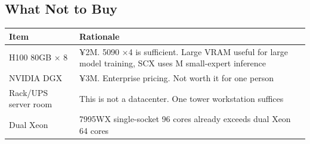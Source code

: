 \documentclass[
  12pt,
]{article}
\begin{document}
\subsection{What Not to Buy}\label{what-not-to-buy}

\begin{longtable}[]{@{}
  >{\raggedright\arraybackslash}p{}
  >{\raggedright\arraybackslash}p{}@{}}
\toprule\noalign{}
\begin{minipage}[b]{\linewidth}\raggedright
Item
\end{minipage} & \begin{minipage}[b]{\linewidth}\raggedright
Rationale
\end{minipage} \\
\midrule\noalign{}
\endhead
\bottomrule\noalign{}
\endlastfoot
H100 80GB × 8 & ¥2M. 5090 ×4 is sufficient. Large VRAM useful for large model training, SCX uses M small-expert inference \\
NVIDIA DGX & ¥3M. Enterprise pricing. Not worth it for one person \\
Rack/UPS server room & This is not a datacenter. One tower workstation suffices \\
Dual Xeon & 7995WX single-socket 96 cores already exceeds dual Xeon 64 cores \\
\end{longtable}
\end{document}
